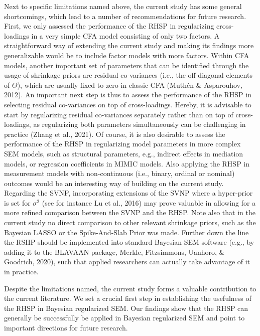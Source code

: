 \documentclass[
  man, donotrepeattitle,floatsintext]{apa6}
\begin{document}
Next to specific limitations named above, the current study has some general shortcomings, which lead to a number of recommendations for future research. First, we only assessed the performance of the RHSP in regularizing cross-loadings in a very simple CFA model consisting of only two factors. A straightforward way of extending the current study and making its findings more generalizable would be to include factor models with more factors. Within CFA models, another important set of parameters that can be identified through the usage of shrinkage priors are residual co-variances (i.e., the off-diagonal elements of \(\Theta\)), which are usually fixed to zero in classic CFA (Muthén \& Asparouhov, 2012). An important next step is thus to assess the performance of the RHSP in selecting residual co-variances on top of cross-loadings. Hereby, it is advisable to start by regularizing residual co-variances separately rather than on top of cross-loadings, as regularizing both parameters simultaneously can be challenging in practice (Zhang et al., 2021). Of course, it is also desirable to assess the performance of the RHSP in regularizing model parameters in more complex SEM models, such as structural parameters, e.g., indirect effects in mediation models, or regression coefficients in MIMIC models. Also applying the RHSP in measurement models with non-continuous (i.e., binary, ordinal or nominal) outcomes would be an interesting way of building on the current study. Regarding the SVNP, incorporating extensions of the SVNP where a hyper-prior is set for \(\sigma^2\) (see for instance Lu et al., 2016) may prove valuable in allowing for a more refined comparison between the SVNP and the RHSP. Note also that in the current study no direct comparison to other relevant shrinkage priors, such as the Bayesian LASSO or the Spike-And-Slab Prior was made. Further down the line the RSHP should be implemented into standard Bayesian SEM software (e.g., by adding it to the BLAVAAN package, Merkle, Fitzsimmons, Uanhoro, \& Goodrich, 2020), such that applied researchers can actually take advantage of it in practice.

Despite the limitations named, the current study forms a valuable contribution to the current literature. We set a crucial first step in establishing the usefulness of the RHSP in Bayesian regularized SEM. Our findings show that the RHSP can generally be successfully be applied in Bayesian regularized SEM and point to important directions for future research.

\clearpage
\end{document}
